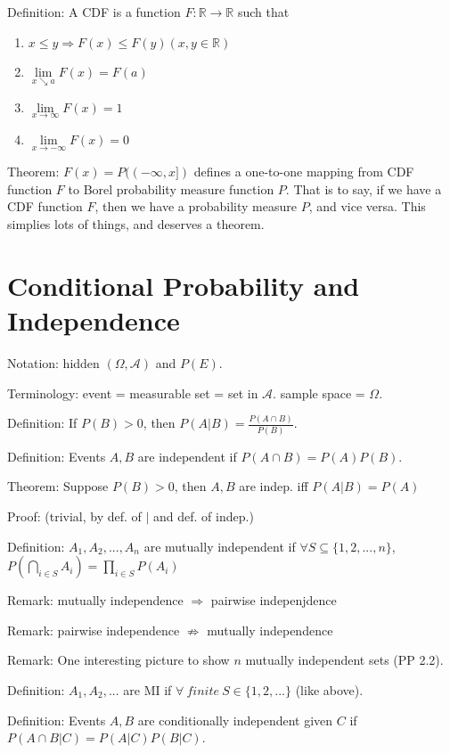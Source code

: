 \documentclass[12pt]{article}
\newcommand{\A}{\mathcal{A}}
\begin{document}
Definition: A CDF is a function $F:\mathbb{R}\rightarrow\mathbb{R}$ such that
\begin{enumerate}
    \item $x\le y \Rightarrow F(x)\le F(y) (x,y\in \mathbb{R})$
    \item $\lim\limits_{x\searrow a} F(x) = F(a)$
    \item $\lim\limits_{x\rightarrow \infty} F(x) = 1$
    \item $\lim\limits_{x\rightarrow -\infty} F(x)=0$
\end{enumerate}

Theorem: $F(x)=P((-\infty,x])$ defines a one-to-one mapping from CDF function $F$
to Borel probability measure function $P$. That is to say, if
we have a CDF function $F$, then we have a probability measure $P$, and vice versa.
This simplies lots of things, and deserves a theorem.


\section{Conditional Probability and Independence}

Notation: hidden $(\Omega,\A)$ and $P(E)$.

Terminology: event = measurable set = set in $\A$. sample space = $\Omega$. 
\bigbreak

Definition: If $P(B)>0$, then $P(A|B)=\frac{P(A\cap B)}{P(B)}$.
\bigbreak

Definition: Events $A, B$ are independent if $P(A\cap B) = P(A) P(B)$.
\bigbreak

Theorem: Suppose $P(B)>0$, then $A,B$ are indep. iff $P(A|B)=P(A)$

Proof: (trivial, by def. of $|$ and def. of indep.)
\bigbreak

Definition: $A_1,A_2,...,A_n$ are mutually independent if $\forall S\subseteq \{1,2,...,n\}$,
$P(\bigcap\limits_{i\in S} A_i) = \prod\limits_{i\in S} P(A_i)$

Remark: mutually independence $\Rightarrow$ pairwise indepenjdence

Remark: pairwise independence $\nRightarrow$ mutually independence

Remark: One interesting picture to show $n$ mutually independent sets (PP 2.2).
\bigbreak

Definition: $A_1, A_2,...$ are MI if $\forall\ finite\ S\in \{1,2,...\}$ (like above).
\bigbreak

Definition: Events $A,B$ are conditionally independent given $C$ if
$P(A\cap B | C) = P(A|C) P (B|C)$.
\end{document}
